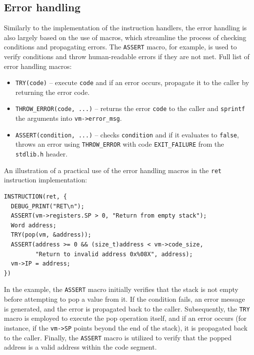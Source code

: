 \documentclass[10pt,a4paper,final]{article}
\newcommand{\code}[1]{\texttt{#1}}
\begin{document}
\subsection{Error handling}
\label{sec:errors}

Similarly to the implementation of the instruction handlers, the error handling
is also largely based on the use of macros, which streamline the process of
checking conditions and propagating errors. The \code{ASSERT} macro, for
example, is used to verify conditions and throw human-readable errors if they
are not met. Full list of error handling macros:

\begin{itemize}
\item \code{TRY(code)} -- execute \code{code} and if an error occurs, propagate
    it to the caller by returning the error code.
\item \code{THROW_ERROR(code, ...)} -- returns the error \code{code} to the
    caller and \code{sprintf} the arguments into \code{vm->error_msg}.
\item \code{ASSERT(condition, ...)} -- checks \code{condition} and if it
    evaluates to \code{false}, throws an error using \code{THROW_ERROR} with
    code \code{EXIT_FAILURE} from the \code{stdlib.h} header.
\end{itemize}

An illustration of a practical use of the error handling macros in the
\code{ret} instruction implementation:

\begin{verbatim}
INSTRUCTION(ret, {
  DEBUG_PRINT("RET\n");
  ASSERT(vm->registers.SP > 0, "Return from empty stack");
  Word address;
  TRY(pop(vm, &address));
  ASSERT(address >= 0 && (size_t)address < vm->code_size,
         "Return to invalid address 0x%08X", address);
  vm->IP = address;
})
\end{verbatim}

In the example, the \code{ASSERT} macro initially verifies that the stack is not
empty before attempting to pop a value from it. If the condition fails, an error
message is generated, and the error is propagated back to the caller.
Subsequently, the \code{TRY} macro is employed to execute the pop operation
itself, and if an error occurs (for instance, if the \code{vm->SP} points beyond
the end of the stack), it is propagated back to the caller. Finally, the
\code{ASSERT} macro is utilized to verify that the popped address is a valid
address within the code segment.
\end{document}
